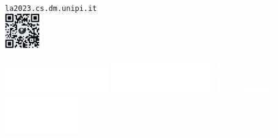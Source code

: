 \documentclass[a4paper]{article}
\begin{document}
\\
    \mbox{}\hspace{1cm}
    \begin{minipage}{2cm}
    {\mbox{\hspace{-0.2cm}}\tiny\texttt{la2023.cs.dm.unipi.it}}\\
    \includegraphics*[height=1.5cm]{qr-bw.png}\mbox{}
    \vspace{1.2cm}\mbox{}
    \end{minipage}
    \noindent
    \hspace{0.5cm}
    \includegraphics*[height=1.3cm]{matematica_dx_bianco.pdf}
    \hspace{0.1cm}
    \includegraphics*[height=1.5cm]{marchio_unipi_orizz_white.png}
    \mbox{}\hspace{0.5cm}
    \includegraphics*[height=1.5cm]{Sns-Scuola-Normale-Superiore-Pisa.png}
    \hspace{0.5cm}
    \includegraphics*[height=1.6cm]{logo_DIMAI_positivo-1-300x150.png}
    \mbox{}
\end{document}
